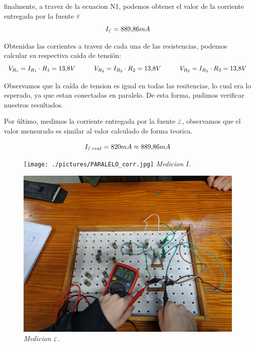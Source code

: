 \documentclass[12pt]{report}
\newcommand {\LEpsilon}{\mathlarger{\mathlarger{\varepsilon}}}
\begin{document}
\vspace{7mm}

finalmente, a travez de la ecuacion N1, podemos obtener el valor de la corriente entregada 
por la fuente $\LEpsilon$
$$I_{\LEpsilon} = 889,\!86 mA$$

Obtenidas las corrientes a travez de cada una de las resistencias, podemos calcular su respectiva
caida de tensión:
$$ V_{R_1} = I_{R_1} \cdot R_1 = 13,\!8V \hspace{10mm} V_{R_2} = I_{R_2} \cdot R_2 = 13,\!8V 
\hspace{10mm} V_{R_3} = I_{R_3} \cdot R_3 = 13,\!8V $$

Observamos que la caída de tension es igual en todas las resitencias, lo cual era lo esperado, ya
que estan conectadas en paralelo. De esta forma, pudimos verificar nuestros resultados.

Por último, medimos la corriente entregada por la fuente $\LEpsilon$, observamos que el
valor mensurado es similar al valor calculado de forma teorica.

$$ I_{\LEpsilon \hspace{0,5mm} real} = 820mA \approx 889,\!86 mA $$

\noindent
\begin{figure}[h]
  \centering
  \begin{minipage}[h]{0.4\textwidth}
    \centering
    \texttt{[image: ./pictures/PARALELO\_corr.jpg]}
    \textit{Medicion $I$.}
  \end{minipage}\hskip 1cm
  \begin{minipage}[h]{0.4\textwidth}
    \centering
    \includegraphics[width=1\textwidth]{./pictures/PARALELO_fem.jpg}
    \textit{Medicion $\LEpsilon$.}
  \end{minipage}
\end{figure}
\end{document}
